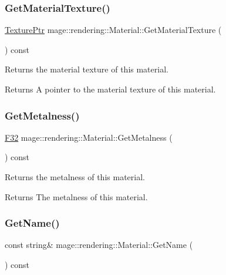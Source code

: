 \subsubsection{\texorpdfstring{Get\+Material\+Texture()}{GetMaterialTexture()}}
{\footnotesize\ttfamily \hyperlink{namespacemage_1_1rendering_a6f3ae54f825328465b0cdde0f0de4a36}{Texture\+Ptr} mage\+::rendering\+::\+Material\+::\+Get\+Material\+Texture (\begin{DoxyParamCaption}{ }\end{DoxyParamCaption}) const\hspace{0.3cm}{\ttfamily [noexcept]}}

Returns the material texture of this material.

\begin{DoxyReturn}{Returns}
A pointer to the material texture of this material. 
\end{DoxyReturn}
\hypertarget{classmage_1_1rendering_1_1_material_aaa4265533437b462e2f2087cfa37e623}{}\label{classmage_1_1rendering_1_1_material_aaa4265533437b462e2f2087cfa37e623} 
\subsubsection{\texorpdfstring{Get\+Metalness()}{GetMetalness()}}
{\footnotesize\ttfamily \hyperlink{namespacemage_aa97e833b45f06d60a0a9c4fc22ae02c0}{F32} mage\+::rendering\+::\+Material\+::\+Get\+Metalness (\begin{DoxyParamCaption}{ }\end{DoxyParamCaption}) const\hspace{0.3cm}{\ttfamily [noexcept]}}

Returns the metalness of this material.

\begin{DoxyReturn}{Returns}
The metalness of this material. 
\end{DoxyReturn}
\hypertarget{classmage_1_1rendering_1_1_material_ab94089dbe7d1b242fad455e9c233a78c}{}\label{classmage_1_1rendering_1_1_material_ab94089dbe7d1b242fad455e9c233a78c} 
\subsubsection{\texorpdfstring{Get\+Name()}{GetName()}}
{\footnotesize\ttfamily const string\& mage\+::rendering\+::\+Material\+::\+Get\+Name (\begin{DoxyParamCaption}{ }\end{DoxyParamCaption}) const\hspace{0.3cm}{\ttfamily [noexcept]}}


